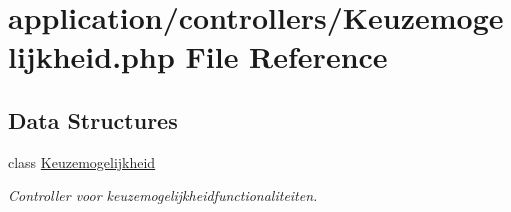 \hypertarget{_keuzemogelijkheid_8php}{}\section{application/controllers/\+Keuzemogelijkheid.php File Reference}
\label{_keuzemogelijkheid_8php}
\subsection*{Data Structures}
\begin{DoxyCompactItemize}
\item 
class \mbox{\hyperlink{class_keuzemogelijkheid}{Keuzemogelijkheid}}
\begin{DoxyCompactList}\small\item\em Controller voor keuzemogelijkheidfunctionaliteiten. \end{DoxyCompactList}\end{DoxyCompactItemize}
